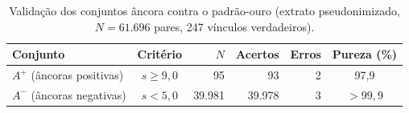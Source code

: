 \begin{table}[!ht]
\centering
\caption{Validação dos conjuntos âncora contra o padrão-ouro (extrato pseudonimizado, $N = 61.696$ pares, 247 vínculos verdadeiros).}
\label{tab:cap8-ancoras}
\begin{tabular}{|l|c|r|r|r|c|}
\hline
Conjunto & Critério & $N$ & Acertos & Erros & Pureza (\%) \\
\hline
$A^+$ (âncoras positivas) & $s\geq 9{,}0$ & 95 & 93 & 2 & 97,9 \\
\hline
$A^-$ (âncoras negativas) & $s<5{,}0$ & 39.981 & 39.978 & 3 & $>99{,}9$ \\
\hline
\end{tabular}
\end{table}
